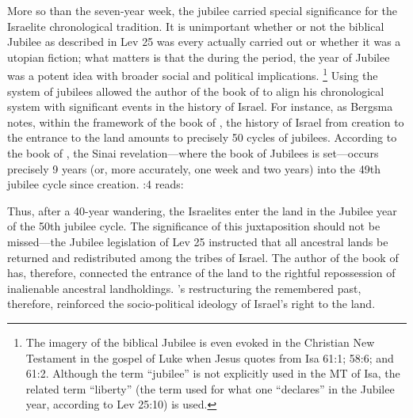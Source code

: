 More so than the seven-year week, the jubilee carried special significance for the Israelite chronological tradition. It is unimportant whether or not the biblical Jubilee as described in Lev 25 was every actually carried out or whether it was a utopian fiction; what matters is that the during the \secondtemple period, the year of Jubilee was a potent idea with broader social and political implications.%
    \footnote{The imagery of the biblical Jubilee is even evoked in the Christian New Testament in the gospel of Luke when Jesus quotes from Isa 61:1; 58:6; and 61:2. Although the term  ``jubilee'' is not explicitly used in the MT of Isa, the related term  ``liberty'' (the term used for what one ``declares'' in the Jubilee year, according to Lev 25:10) is used.}
Using the system of jubilees allowed the author of the book of \jub to align his chronological system with significant events in the history of Israel. For instance, as Bergsma notes, within the framework of the book of \jub, the history of Israel from creation to the entrance to the land amounts to precisely 50 cycles of jubilees.\autocite[234--235]{bergsma2007}
According to the book of \jub, the Sinai revelation---where the book of Jubilees is set---occurs precisely 9 years (or, more accurately, one week and two years) into the 49th jubilee cycle since creation. :4 reads:



\noindent
Thus, after a 40-year wandering, the Israelites enter the land in the Jubilee year of the 50th jubilee cycle. The significance of this juxtaposition should not be missed---the Jubilee legislation of Lev 25 instructed that all ancestral lands be returned and redistributed among the tribes of Israel. The author of the book of \jub has, therefore, connected the entrance of the land to the rightful repossession of inalienable ancestral landholdings. \jub's restructuring the remembered past, therefore, reinforced the socio-political ideology of Israel's right to the land.

